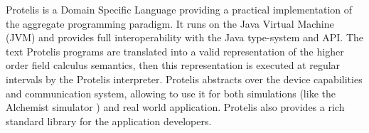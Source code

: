 Protelis \cite{Protelis} is a Domain Specific Language providing a practical implementation of the aggregate programming paradigm. It runs on the Java Virtual Machine (JVM) and provides full interoperability with the Java type-system and API. The text Protelis programs are translated into a valid representation of the higher order field calculus semantics, then this representation is executed at regular intervals by the Protelis interpreter. Protelis abstracts over the device capabilities and communication system, allowing to use it for both simulations (like the Alchemist simulator \cite{Alchemist}) and real world application. Protelis also provides a rich standard library for the application developers.

\begin{figure}[t]
\centering
\centerline{}
\end{figure}
